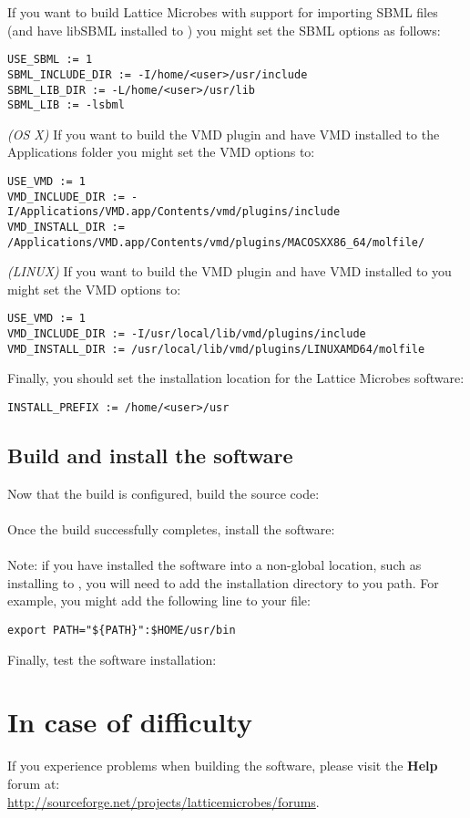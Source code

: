 If you want to build Lattice Microbes with support for importing SBML files (and have libSBML installed to ) you might set the SBML options as follows:
{\small\begin{verbatim}
USE_SBML := 1
SBML_INCLUDE_DIR := -I/home/<user>/usr/include
SBML_LIB_DIR := -L/home/<user>/usr/lib
SBML_LIB := -lsbml
\end{verbatim}}

{\it (OS X)} If you want to build the VMD plugin and have VMD installed to the Applications folder you might set the VMD options to:
{\small\begin{verbatim}
USE_VMD := 1
VMD_INCLUDE_DIR := -I/Applications/VMD.app/Contents/vmd/plugins/include
VMD_INSTALL_DIR := /Applications/VMD.app/Contents/vmd/plugins/MACOSXX86_64/molfile/
\end{verbatim}}

{\it (LINUX)} If you want to build the VMD plugin and have VMD installed to  you might set the VMD options to:
{\small\begin{verbatim}
USE_VMD := 1
VMD_INCLUDE_DIR := -I/usr/local/lib/vmd/plugins/include
VMD_INSTALL_DIR := /usr/local/lib/vmd/plugins/LINUXAMD64/molfile
\end{verbatim}}

Finally, you should set the installation location for the Lattice Microbes software:
{\small\begin{verbatim}
INSTALL_PREFIX := /home/<user>/usr
\end{verbatim}}

\subsection{Build and install the software}

Now that the build is configured, build the source code:\\
\\

Once the build successfully completes, install the software:\\
\\

Note: if you have installed the software into a non-global location, such as installing to , you will need to add the installation directory to you path. For example, you might add the following line to your  file:
{\small\begin{verbatim}
export PATH="${PATH}":$HOME/usr/bin
\end{verbatim}}

Finally, test the software installation: \\

\section{In case of difficulty}
If you experience problems when building the software, please visit the {\bf Help} forum at:\\ \url{http://sourceforge.net/projects/latticemicrobes/forums}.


